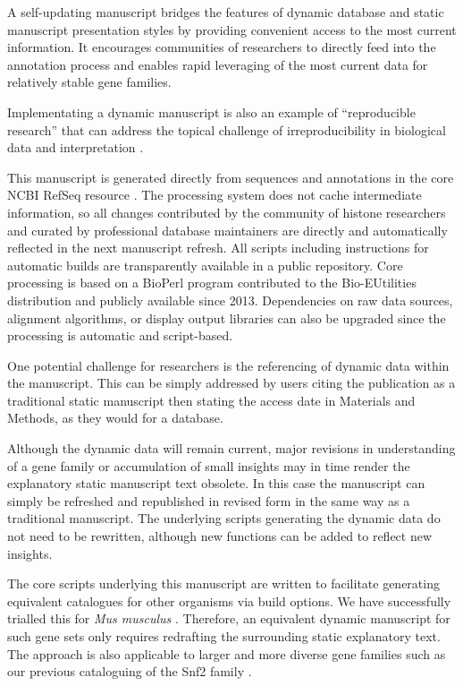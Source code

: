   A self-updating manuscript bridges the features of dynamic database and static manuscript
  presentation styles by providing convenient access to the most current information.
  It encourages communities of researchers to directly feed into the annotation process
  and enables rapid leveraging of the most current data for relatively stable gene families.

  Implementating a dynamic manuscript is also an example of ``reproducible research''
  \citep{reproducible-research-bioinformatics,reproducible-research-law}
  that can address the topical challenge of irreproducibility in biological data
  and interpretation \citep{ErrorProne2012,OpenPrograms2012}.

  This manuscript is generated directly from sequences and annotations
  in the core NCBI RefSeq resource \citep{OLearyRefseq2016}.
  The processing system does not cache intermediate information,
  so all changes contributed by the community of histone researchers
  and curated by professional database maintainers
  are directly and automatically reflected in the next manuscript refresh.
  All scripts including instructions for automatic builds
  are transparently available in a public repository.
  Core processing is based on a BioPerl program contributed to the Bio-EUtilities distribution
  and publicly available since 2013.
  Dependencies on raw data sources, alignment algorithms, or display output libraries
  can also be upgraded since the processing is automatic and script-based.

  One potential challenge for researchers is the referencing of dynamic data within the manuscript.
  This can be simply addressed by users citing the publication as a traditional static manuscript
  then stating the access date in Materials and Methods, as they would for a database.

  Although the dynamic data will remain current,
  major revisions in understanding of a gene family or accumulation of small insights
  may in time render the explanatory static manuscript text obsolete.
  In this case the manuscript can simply be refreshed and republished in revised form
  in the same way as a traditional manuscript.
  The underlying scripts generating the dynamic data do not need to be rewritten,
  although new functions can be added to reflect new insights.

  The core scripts underlying this manuscript are written to facilitate generating
  equivalent catalogues for other organisms via build options.
  We have successfully trialled this for
  \textit{Mus musculus} .
  Therefore, an equivalent dynamic manuscript for such gene sets
  only requires redrafting the surrounding static explanatory text.
  The approach is also applicable to larger and more diverse gene families such as
  our previous cataloguing of the Snf2 family \citep{andrew-snf2-catalogue}.
